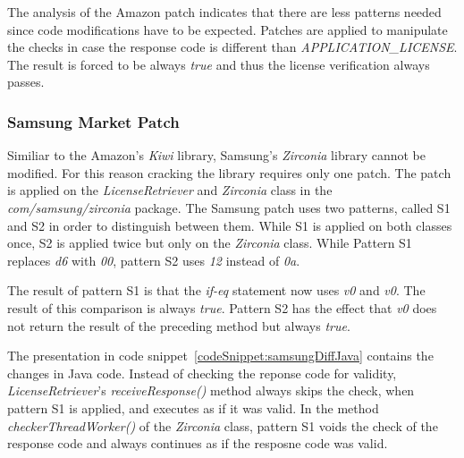 The analysis of the Amazon patch indicates that there are less patterns needed since code modifications have to be expected.
Patches are applied to manipulate the checks in case the response code is different than \textit{APPLICATION\_LICENSE}.
The result is forced to be always \textit{true} and thus the license verification always passes.


\subsubsection{Samsung Market Patch}
Similiar to the Amazon's \textit{Kiwi} library, Samsung's \textit{Zirconia} library cannot be modified.
For this reason cracking the library requires only one patch.
The patch is applied on the \textit{LicenseRetriever} and \textit{Zirconia} class in the \textit{com/samsung/zirconia} package.
The Samsung patch uses two patterns, called S1 and S2 in order to distinguish between them.
While S1 is applied on both classes once, S2 is applied twice but only on the \textit{Zirconia} class.
\newline
While Pattern S1 replaces \textit{d6} with \textit{00}, pattern S2 uses \textit{12} instead of \textit{0a}.
\newline

The result of pattern S1 is that the \textit{if-eq} statement now uses \textit{v0} and \textit{v0}.
The result of this comparison is always \textit{true}.
Pattern S2 has the effect that \textit{v0} does not return the result of the preceding method but always \textit{true}.
\newline

The presentation in code snippet~\ref{codeSnippet:samsungDiffJava} contains the changes in Java code.
Instead of checking the reponse code for validity, \textit{LicenseRetriever}'s \textit{receiveResponse()} method always skips the check, when pattern S1 is applied, and executes as if it was valid.
In the method \textit{checkerThreadWorker()} of the \textit{Zirconia} class, pattern S1 voids the check of the response code and always continues as if the resposne code was valid.
\newline
